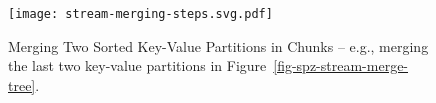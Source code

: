 \begin{figure}[!t]
  \centering
  \texttt{[image: stream-merging-steps.svg.pdf]}
  \caption{
    Merging Two Sorted Key-Value Partitions in Chunks -- e.g., merging the last two key-value partitions in Figure~\ref{fig-spz-stream-merge-tree}.
  }
  \label{fig-spz-stream-merging-steps}
  \vspace{-0.2cm}
\end{figure}
